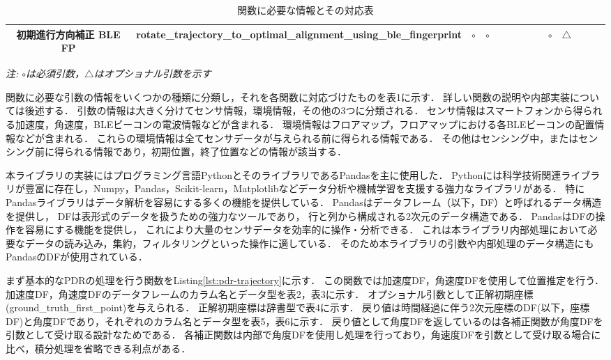 \begin{table}[ht]
{\begin{tabular}{|c|c|c|c|c|c|c|c|c|c|c|c|c|c|}
			初期進行方向補正 BLE FP & rotate\_trajectory\_to\_optimal\_alignment\_using\_ble\_fingerprint
			                & \multicolumn{1}{c|}{$\circ$}                                        & \multicolumn{1}{c|}{$\circ$} &                              &                              &                              &                              &                                                                                                               & \multicolumn{1}{c|}{$\circ$} & \multicolumn{1}{c|}{$\triangle$} &                                  &    &                                   \\ \hline
		\end{tabular}
	}
	\caption{関数に必要な情報とその対応表} \label{}
	\textit{注: $\circ$は必須引数，$\triangle$はオプショナル引数を示す} \label{tab:my_label}
\end{table}


関数に必要な引数の情報をいくつかの種類に分類し，それを各関数に対応づけたものを表1に示す．
詳しい関数の説明や内部実装については後述する．
引数の情報は大きく分けてセンサ情報，環境情報，その他の3つに分類される．
センサ情報はスマートフォンから得られる加速度，角速度，BLEビーコンの電波情報などが含まれる．
環境情報はフロアマップ，フロアマップにおける各BLEビーコンの配置情報などが含まれる．
これらの環境情報は全てセンサデータが与えられる前に得られる情報である．
その他はセンシング中，またはセンシング前に得られる情報であり，初期位置，終了位置などの情報が該当する．

本ライブラリの実装にはプログラミング言語PythonとそのライブラリであるPandasを主に使用した．
Pythonには科学技術関連ライブラリが豊富に存在し，Numpy，Pandas，Scikit-learn，Matplotlibなどデータ分析や機械学習を支援する強力なライブラリがある．
特にPandasライブラリはデータ解析を容易にする多くの機能を提供している．
Pandasはデータフレーム（以下，DF）と呼ばれるデータ構造を提供し，
DFは表形式のデータを扱うための強力なツールであり，
行と列から構成される2次元のデータ構造である．
PandasはDFの操作を容易にする機能を提供し，
これにより大量のセンサデータを効率的に操作・分析できる．
これは本ライブラリ内部処理において必要なデータの読み込み，集約，フィルタリングといった操作に適している．
そのため本ライブラリの引数や内部処理のデータ構造にもPandasのDFが使用されている．

まず基本的なPDRの処理を行う関数をListing\ref{lst:pdr-trajectory}に示す．
この関数では加速度DF，角速度DFを使用して位置推定を行う．
加速度DF，角速度DFのデータフレームのカラム名とデータ型を表2，表3に示す．
オプショナル引数として正解初期座標(ground\_truth\_first\_point)を与えられる．
正解初期座標は辞書型で表4に示す．
戻り値は時間経過に伴う2次元座標のDF(以下，座標DF)と角度DFであり，それぞれのカラム名とデータ型を表5，表6に示す．
戻り値として角度DFを返しているのは各補正関数が角度DFを引数として受け取る設計なためである．
各補正関数は内部で角度DFを使用し処理を行っており，角速度DFを引数として受け取る場合に比べ，積分処理を省略できる利点がある．

